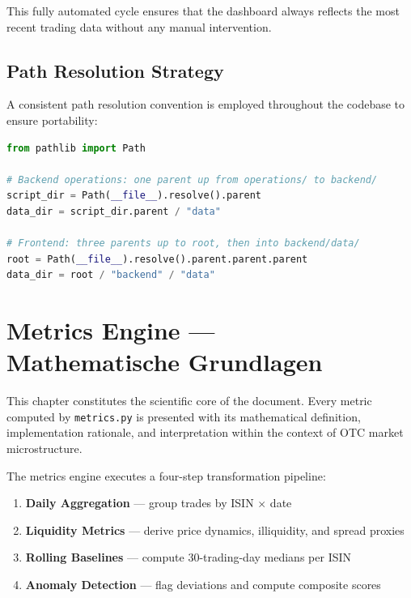 \documentclass[
  11pt,
  a4paper,
  twoside,
  openany
]{report}
\begin{document}
This fully automated cycle ensures that the dashboard always reflects the most recent trading data without any manual intervention.

\section{Path Resolution Strategy}

A consistent path resolution convention is employed throughout the codebase to ensure portability:

\begin{lstlisting}[language=Python, caption={Path resolution pattern — no hardcoded paths}]
from pathlib import Path

# Backend operations: one parent up from operations/ to backend/
script_dir = Path(__file__).resolve().parent
data_dir = script_dir.parent / "data"

# Frontend: three parents up to root, then into backend/data/
root = Path(__file__).resolve().parent.parent.parent
data_dir = root / "backend" / "data"
\end{lstlisting}


\chapter[Metrics Engine — Mathematische Grundlagen]{Metrics Engine —\\Mathematische Grundlagen}
\label{ch:metrics}

This chapter constitutes the scientific core of the document.  Every metric computed by \texttt{metrics.py} is presented with its mathematical definition, implementation rationale, and interpretation within the context of OTC market microstructure.

The metrics engine executes a four-step transformation pipeline:

\begin{enumerate}[label=\textcolor{SwissRed}{\textbf{Step \arabic*:}}, leftmargin=3.5em]
  \item \textbf{Daily Aggregation} — group trades by ISIN $\times$ date
  \item \textbf{Liquidity Metrics} — derive price dynamics, illiquidity, and spread proxies
  \item \textbf{Rolling Baselines} — compute 30-trading-day medians per ISIN
  \item \textbf{Anomaly Detection} — flag deviations and compute composite scores
\end{enumerate}
\end{document}
